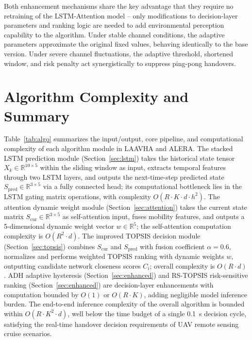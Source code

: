 \documentclass[journal,article,submit,moreauthors]{Definitions/mdpi}
\begin{document}
Both enhancement mechanisms share the key advantage that they require no retraining of the LSTM-Attention model -- only modifications to decision-layer parameters and ranking logic are needed to add environmental perception capability to the algorithm. Under stable channel conditions, the adaptive parameters approximate the original fixed values, behaving identically to the base version. Under severe channel fluctuations, the adaptive threshold, shortened window, and risk penalty act synergistically to suppress ping-pong handovers.

\section{Algorithm Complexity and Summary}
\label{sec:complexity}

Table~\ref{tab:algo} summarizes the input/output, core pipeline, and computational complexity of each algorithm module in LAAVHA and ALERA. The stacked LSTM prediction module (Section~\ref{sec:lstm}) takes the historical state tensor $X_k \in \mathbb{R}^{10 \times 5}$ within the sliding window as input, extracts temporal features through two LSTM layers, and outputs the next-time-step predicted state $S_{\text{pred}} \in \mathbb{R}^{3 \times 5}$ via a fully connected head; its computational bottleneck lies in the LSTM gating matrix operations, with complexity $O(R \cdot K \cdot d \cdot h^2)$. The attention dynamic weight module (Section~\ref{sec:attention}) takes the current state matrix $S_{\text{cur}} \in \mathbb{R}^{3 \times 5}$ as self-attention input, fuses mobility features, and outputs a 5-dimensional dynamic weight vector $w \in \mathbb{R}^5$; the self-attention computation complexity is $O(R^2 \cdot d)$. The improved TOPSIS decision module (Section~\ref{sec:topsis}) combines $S_{\text{cur}}$ and $S_{\text{pred}}$ with fusion coefficient $\alpha = 0.6$, normalizes and performs weighted TOPSIS ranking with dynamic weights $w$, outputting candidate network closeness scores $C_i$; overall complexity is $O(R \cdot d)$. ADH adaptive hysteresis (Section~\ref{sec:enhanced}) and RS-TOPSIS risk-sensitive ranking (Section~\ref{sec:enhanced}) are decision-layer enhancements with computation bounded by $O(1)$ or $O(R \cdot K)$, adding negligible model inference burden. The end-to-end inference complexity of the overall algorithm is bounded within $O(R \cdot K^2 \cdot d)$, well below the time budget of a single 0.1~s decision cycle, satisfying the real-time handover decision requirements of UAV remote sensing cruise scenarios.
\end{document}

